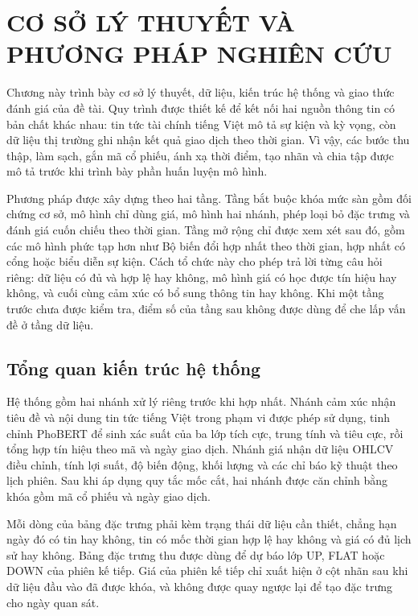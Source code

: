 \chapter{CƠ SỞ LÝ THUYẾT VÀ PHƯƠNG PHÁP NGHIÊN CỨU}
\label{ch:phuong-phap}

Chương này trình bày cơ sở lý thuyết, dữ liệu, kiến trúc hệ thống và giao thức đánh giá
của đề tài. Quy trình được thiết kế để kết nối hai nguồn thông tin có bản chất khác nhau:
tin tức tài chính tiếng Việt mô tả sự kiện và kỳ vọng, còn dữ liệu thị trường ghi nhận
kết quả giao dịch theo thời gian. Vì vậy, các bước thu thập, làm sạch, gắn mã cổ phiếu,
ánh xạ thời điểm, tạo nhãn và chia tập được mô tả trước khi trình bày phần huấn luyện
mô hình.

Phương pháp được xây dựng theo hai tầng. Tầng bắt buộc khóa mức sàn gồm đối chứng cơ sở,
mô hình chỉ dùng giá, mô hình hai nhánh, phép loại bỏ đặc trưng và đánh giá cuốn chiếu
theo thời gian. Tầng mở rộng chỉ được xem xét sau đó, gồm các mô hình phức tạp hơn như
Bộ biến đổi hợp nhất theo thời gian, hợp nhất có cổng hoặc biểu diễn sự kiện. Cách tổ
chức này cho phép trả lời từng câu hỏi riêng: dữ liệu có đủ và hợp lệ hay không, mô hình
giá có học được tín hiệu hay không, và cuối cùng cảm xúc có bổ sung thông tin hay không.
Khi một tầng trước chưa được kiểm tra, điểm số của tầng sau không được dùng để che lấp
vấn đề ở tầng dữ liệu.

\section{Tổng quan kiến trúc hệ thống}
\label{sec:pp-kien-truc}

Hệ thống gồm hai nhánh xử lý riêng trước khi hợp nhất. Nhánh cảm xúc nhận tiêu đề và
nội dung tin tức tiếng Việt trong phạm vi được phép sử dụng, tinh chỉnh PhoBERT để sinh
xác suất của ba lớp tích cực, trung tính và tiêu cực, rồi tổng hợp tín hiệu theo mã và
ngày giao dịch. Nhánh giá nhận dữ liệu OHLCV điều chỉnh, tính lợi suất, độ biến động,
khối lượng và các chỉ báo kỹ thuật theo lịch phiên. Sau khi áp dụng quy tắc mốc cắt,
hai nhánh được căn chỉnh bằng khóa gồm mã cổ phiếu và ngày giao dịch.

Mỗi dòng của bảng đặc trưng phải kèm trạng thái dữ liệu cần thiết, chẳng hạn ngày đó có
tin hay không, tin có mốc thời gian hợp lệ hay không và giá có đủ lịch sử hay không.
Bảng đặc trưng thu được dùng để dự báo lớp UP, FLAT hoặc DOWN của phiên kế tiếp. Giá
của phiên kế tiếp chỉ xuất hiện ở cột nhãn sau khi dữ liệu đầu vào đã được khóa, và
không được quay ngược lại để tạo đặc trưng cho ngày quan sát.

